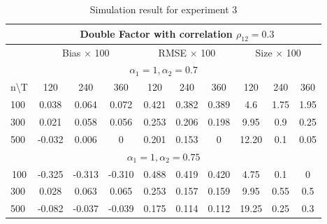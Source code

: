 	\begin{table}[]
		\caption{Simulation result for experiment 3}\label{table:exp3}
		\centering
	\begin{tabular}{lccccccccc}
		\hline
		\hline
		\multicolumn{1}{l|}{}                   & \multicolumn{9}{c}{Double Factor with correlation $\rho_{12} = 0.3$}                                                               \\ \hline
		\multicolumn{1}{l|}{}                   & \multicolumn{3}{c|}{Bias $\times$ 100}        & \multicolumn{3}{c|}{RMSE $\times$ 100}     & \multicolumn{3}{c}{Size $\times$ 100} \\ \hline
		\multicolumn{10}{c}{$\alpha_1 = 1, \alpha_2 = 0.7$}                                                                                                                            \\ \hline
		\multicolumn{1}{l|}{n\textbackslash{}T} & 120    & 240    & \multicolumn{1}{c|}{360}    & 120   & 240   & \multicolumn{1}{c|}{360}   & 120          & 240        & 360        \\ \hline
		\multicolumn{1}{l|}{100}                & 0.038  & 0.064  & \multicolumn{1}{c|}{0.072}  & 0.421 & 0.382 & \multicolumn{1}{c|}{0.389} & 4.6          & 1.75       & 1.95       \\
		\multicolumn{1}{l|}{300}                & 0.021  & 0.058  & \multicolumn{1}{c|}{0.056}  & 0.253 & 0.206 & \multicolumn{1}{c|}{0.198} & 9.95         & 0.9        & 0.25       \\
		\multicolumn{1}{l|}{500}                & -0.032 & 0.006  & \multicolumn{1}{c|}{0}      & 0.201 & 0.153 & \multicolumn{1}{c|}{0}     & 12.20        & 0.1        & 0.05       \\ \hline
		\multicolumn{10}{c}{$\alpha_1 = 1, \alpha_2 = 0.75$}                                                                                                                          \\ \hline
		\multicolumn{1}{c|}{100}                & -0.325 & -0.313 & \multicolumn{1}{c|}{-0.310} & 0.488 & 0.419 & \multicolumn{1}{c|}{0.420} & 4.75         & 0.1        & 0          \\
		\multicolumn{1}{l|}{300}                & 0.028  & 0.063  & \multicolumn{1}{c|}{0.065}  & 0.253 & 0.157 & \multicolumn{1}{c|}{0.159} & 9.95         & 0.55       & 0.5        \\
		\multicolumn{1}{l|}{500}                & -0.082 & -0.037 & \multicolumn{1}{c|}{-0.039} & 0.175 & 0.114 & \multicolumn{1}{c|}{0.112} & 19.25        & 0.25       & 0.3        \\ \hline

\end{tabular}
\end{table}
